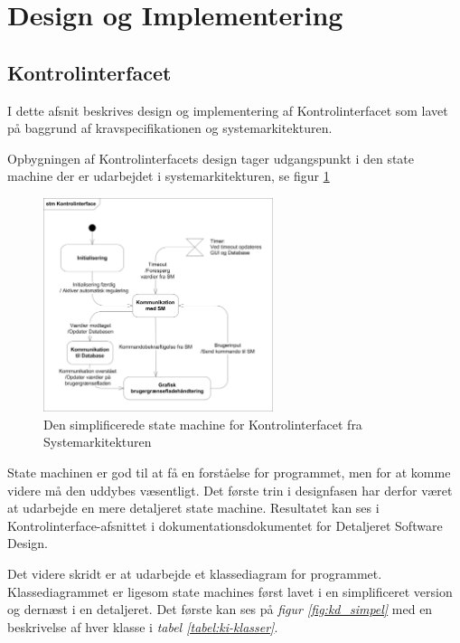 \section{Design og Implementering}
\label{ch:DesignImplementering}

\subsection{Kontrolinterfacet}
I dette afsnit beskrives design og implementering af Kontrolinterfacet som lavet på baggrund af kravspecifikationen og systemarkitekturen. 

Opbygningen af Kontrolinterfacets design tager udgangspunkt i den state machine der er udarbejdet i systemarkitekturen, se figur \ref{fig:KI-stm}

\begin{figure}[htbp]
\centering
\includegraphics[width=0.6\textwidth]{billeder/KI/stm_ki}
\caption{Den simplificerede state machine for Kontrolinterfacet fra Systemarkitekturen}
\label{fig:KI-stm}
\end{figure}

State machinen er god til at få en forståelse for programmet, men for at komme videre må den uddybes væsentligt. Det første trin i designfasen har derfor været at udarbejde en mere detaljeret state machine. Resultatet kan ses i Kontrolinterface-afsnittet i dokumentationsdokumentet for Detaljeret Software Design.

Det videre skridt er at udarbejde et klassediagram for programmet. Klassediagrammet er ligesom state machines først lavet i en simplificeret version og dernæst i en detaljeret. Det første kan ses på \textit{figur \ref{fig:kd_simpel}} med en beskrivelse af hver klasse i \textit{tabel \ref{tabel:ki-klasser}}.\\

